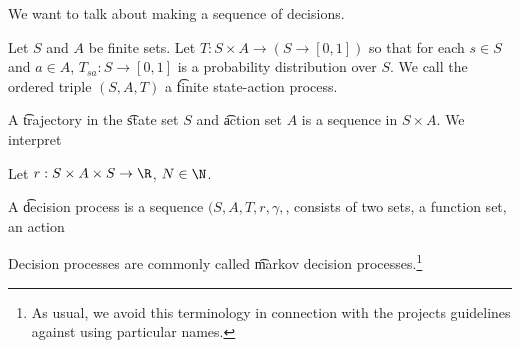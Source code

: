 

We want to talk about making a sequence of decisions.


Let $S$ and $A$ be finite sets.
Let $T: S \times A \to (S \to [0, 1])$ so that for each $s \in S$ and $a \in A$, $T_{sa}: S \to [0, 1]$ is a probability distribution over $S$.
We call the ordered triple $(S, A, T)$ a \t{finite state-action process}.



A \t{trajectory} in the \t{state set} $S$ and \t{action set} $A$ is a sequence in $S \times A$.
We interpret


Let $r: S \times A \times S \to \R$, $N  \in \N$.

A \t{decision process} is a sequence $(S, A, T, r, \gamma, $, consists of two sets, a function set, an action


Decision processes are commonly called \t{markov decision processes}.\footnote{As usual, we avoid this terminology in connection with the projects guidelines against using particular names.}

\blankpage
